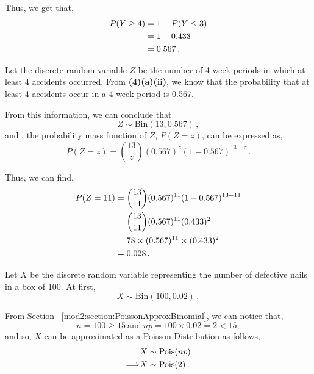 \begin{subquestions}
\begin{subsubquestions}
Thus, we get that,
\begin{align}
	P(Y \geq 4) & = 1 - P(Y \leq 3) \nonumber \\
	            & = 1 - 0.433 \nonumber \\
	            & = 0.567 \,.
\end{align}


\subsubquestion

Let the discrete random variable $Z$ be the number of 4-week periods in which at least 4 accidents occurred. From \textbf{(4)(a)(ii)}, we know that the probability that at least 4 accidents occur in a 4-week period is 0.567.

From this information, we can conclude that
\begin{equation}
	Z \sim \text{Bin}(13,0.567) \,,
\end{equation}
and , the probability mass function of $Z$, $P(Z=z)$, can be expressed as,
\begin{equation}
		P(Z = z) = { 13 \choose z} (0.567)^z  (1-0.567)^{13-z} \,.
\end{equation}

Thus, we can find,
\begin{align}
	P(Z = 11) & = { 13 \choose 11} (0.567)^{11}  (1-0.567)^{13-11} \nonumber \\
	          & = { 13 \choose 11} (0.567)^{11}  (0.433)^{2} \nonumber \\
	          & = 78 \times (0.567)^{11} \times (0.433)^{2} \nonumber \\
	          & = 0.028 \,.
\end{align}

\end{subsubquestions}


\subquestion

Let $X$ be the discrete random variable representing the number of defective nails in a box of 100. At first, 
\begin{equation}
	X \sim \text{Bin}(100,0.02) \,,
\end{equation}

From Section ~\ref{mod2:section:PoissonApproxBinomial}, we can notice that,
\begin{equation}
	n=100 \geq 15 ~\text{and} ~np= 100 \times 0.02=2<15,
\end{equation}  
and so, $X$ can be approximated as a Poisson Distribution as follows,
\begin{align}
	& X \sim \text{Pois}(np) \nonumber \\
	\Longrightarrow & X \sim \text{Pois}(2) \,.
\end{align}


\end{subquestions}
